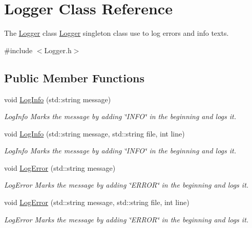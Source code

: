 \hypertarget{classLogger}{\section{Logger Class Reference}
\label{classLogger}
}


The \hyperlink{classLogger}{Logger} class \hyperlink{classLogger}{Logger} singleton class use to log errors and info texts.  




{\ttfamily \#include $<$Logger.\-h$>$}

\subsection*{Public Member Functions}
\begin{DoxyCompactItemize}
\item 
void \hyperlink{classLogger_a827cabc79ba0d1b654ad3f03058dfba2}{Log\-Info} (std\-::string message)
\begin{DoxyCompactList}\small\item\em Log\-Info Marks the message by adding \char`\"{}\-I\-N\-F\-O\char`\"{} in the beginning and logs it. \end{DoxyCompactList}\item 
void \hyperlink{classLogger_aa9c4ebaf5082990fa24afc105522a5a5}{Log\-Info} (std\-::string message, std\-::string file, int line)
\begin{DoxyCompactList}\small\item\em Log\-Info Marks the message by adding \char`\"{}\-I\-N\-F\-O\char`\"{} in the beginning and logs it. \end{DoxyCompactList}\item 
void \hyperlink{classLogger_abb89d37b3a3cbdef1f59273e498f9775}{Log\-Error} (std\-::string message)
\begin{DoxyCompactList}\small\item\em Log\-Error Marks the message by adding \char`\"{}\-E\-R\-R\-O\-R\char`\"{} in the beginning and logs it. \end{DoxyCompactList}\item 
void \hyperlink{classLogger_afc03fb34e6b57f2ec3955da71a6f1fe7}{Log\-Error} (std\-::string message, std\-::string file, int line)
\begin{DoxyCompactList}\small\item\em Log\-Error Marks the message by adding \char`\"{}\-E\-R\-R\-O\-R\char`\"{} in the beginning and logs it. \end{DoxyCompactList}\item 

\end{DoxyCompactItemize}
